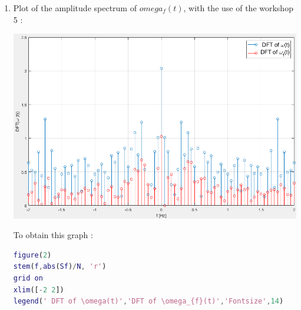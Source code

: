 \documentclass[a4paper,12pt]{article}
\begin{document}
\begin{enumerate}[label={\color{blue}\arabic*)}]
\begin{multicols}{2}
    \columnbreak

    To obtain this graph :
    
    \begin{lstlisting}[style=Matlab-editor,language=Matlab, basicstyle=\small\ttfamily]
% filter design
t1=0:Te2:t(end)-Te2;
fc1=2;
H1=tf(1,[1/(2*pi*fc1)  1]);
Sf=lsim(H1,S,t1);

% plot of filtered signal
figure(1);
plot(t1,Sf,'r')
grid on
legend(' \omega(t) unfiltered','\omega_{f}(t) filtered','Fontsize',14)
        \end{lstlisting}
        
    \end{multicols}

    On Simulink : 
    
    
    \item
    Plot of the amplitude spectrum of \(omega_f(t)\), with the use of the workshop 5 :
    \begin{multicols}{2}
    
        \begin{flushleft}
            \includegraphics[scale=0.22]{Images/DFT_omega_f.png}
            \label{Figure5}
        \end{flushleft}
    \columnbreak

    To obtain this graph :
    
    \begin{lstlisting}[style=Matlab-editor,language=Matlab, basicstyle=\small\ttfamily]
figure(2)
stem(f,abs(Sf)/N, 'r')
grid on
xlim([-2 2])
legend(' DFT of \omega(t)','DFT of \omega_{f}(t)','Fontsize',14)
        \end{lstlisting}
        
    \end{multicols}
    
\end{enumerate}
\end{document}
